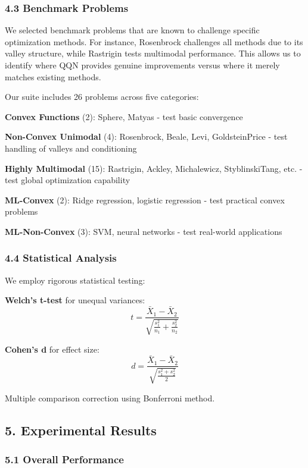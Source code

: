 \hypertarget{benchmark-problems}{%
\subsubsection{4.3 Benchmark Problems}\label{benchmark-problems}}

We selected benchmark problems that are known to challenge specific optimization methods. For instance, Rosenbrock challenges all methods due to its valley structure, while Rastrigin tests multimodal performance. This allows us to identify where QQN provides genuine improvements versus where it merely matches existing methods.

Our suite includes 26 problems across five categories:

\textbf{Convex Functions} (2): Sphere, Matyas - test basic convergence

\textbf{Non-Convex Unimodal} (4): Rosenbrock, Beale, Levi, GoldsteinPrice - test handling of valleys and conditioning

\textbf{Highly Multimodal} (15): Rastrigin, Ackley, Michalewicz, StyblinskiTang, etc. - test global optimization capability

\textbf{ML-Convex} (2): Ridge regression, logistic regression - test practical convex problems

\textbf{ML-Non-Convex} (3): SVM, neural networks - test real-world applications

\hypertarget{statistical-analysis}{%
\subsubsection{4.4 Statistical Analysis}\label{statistical-analysis}}

We employ rigorous statistical testing:

\textbf{Welch's t-test} for unequal variances:
\[t = \frac{\bar{X}_1 - \bar{X}_2}{\sqrt{\frac{s_1^2}{n_1} + \frac{s_2^2}{n_2}}}\]

\textbf{Cohen's d} for effect size:
\[d = \frac{\bar{X}_1 - \bar{X}_2}{\sqrt{\frac{s_1^2 + s_2^2}{2}}}\]

Multiple comparison correction using Bonferroni method.

\hypertarget{experimental-results}{%
\subsection{5. Experimental Results}\label{experimental-results}}

\hypertarget{overall-performance}{%
\subsubsection{5.1 Overall Performance}\label{overall-performance}}

